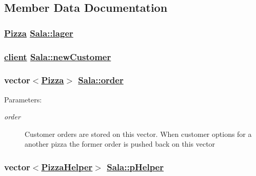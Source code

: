 \subsection{Member Data Documentation}
\hypertarget{class_sala_0f90fe5c344e62852b747ecbdc5b5d90}{
\subsubsection[lager]{\setlength{\rightskip}{0pt plus 5cm}\hyperlink{class_pizza}{Pizza} \hyperlink{class_sala_0f90fe5c344e62852b747ecbdc5b5d90}{Sala::lager}}}
\label{class_sala_0f90fe5c344e62852b747ecbdc5b5d90}


\hypertarget{class_sala_d6980eaf5555befe23d2271575d6d9cb}{
\subsubsection[newCustomer]{\setlength{\rightskip}{0pt plus 5cm}\hyperlink{classclient}{client} \hyperlink{class_sala_d6980eaf5555befe23d2271575d6d9cb}{Sala::new\-Customer}}}
\label{class_sala_d6980eaf5555befe23d2271575d6d9cb}


\hypertarget{class_sala_70a17ffa722a3985b86d30b034ad06d7}{
\subsubsection[order]{\setlength{\rightskip}{0pt plus 5cm}vector$<$\hyperlink{class_pizza}{Pizza}$>$ \hyperlink{class_sala_70a17ffa722a3985b86d30b034ad06d7}{Sala::order}}}
\label{class_sala_70a17ffa722a3985b86d30b034ad06d7}


\begin{Desc}
\item[Parameters:]
\begin{description}
\item[{\em order}]Customer orders are stored on this vector. When customer options for a another pizza the former order is pushed back on this vector \end{description}
\end{Desc}
\hypertarget{class_sala_4b1abb1f80ebc80a2334733ae62acde2}{
\subsubsection[pHelper]{\setlength{\rightskip}{0pt plus 5cm}vector$<$\hyperlink{class_pizza_helper}{Pizza\-Helper}$>$ \hyperlink{class_sala_4b1abb1f80ebc80a2334733ae62acde2}{Sala::p\-Helper}}}
\label{class_sala_4b1abb1f80ebc80a2334733ae62acde2}


